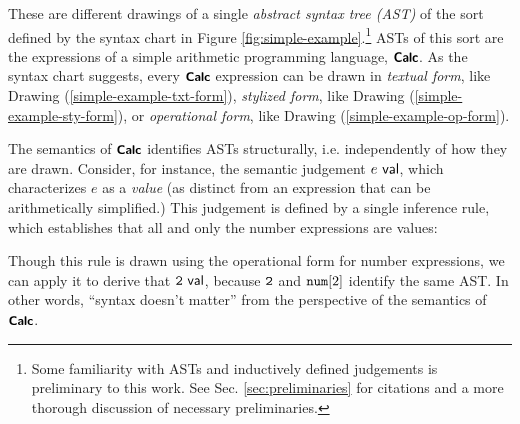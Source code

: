 \noindent
These are different drawings of a single \emph{abstract syntax tree (AST)} of the sort defined by the syntax chart in Figure \ref{fig:simple-example}.\footnote{Some familiarity with ASTs and inductively defined judgements is preliminary to this work. See Sec. \ref{sec:preliminaries} for citations and a more thorough discussion of necessary preliminaries.} ASTs of this sort are the expressions of a simple arithmetic programming language, $\simplelang$. 
As the syntax chart suggests, every $\simplelang$ expression can be drawn in \emph{textual form}, like Drawing (\ref{simple-example-txt-form}), \emph{stylized form}, like Drawing (\ref{simple-example-sty-form}), or \emph{operational form}, like Drawing (\ref{simple-example-op-form}).





 The semantics of $\simplelang$ identifies ASTs {structurally}, i.e. independently of how they are drawn. Consider, for instance, the semantic judgement $\isvalU{e}$, which characterizes $e$ as a \emph{value} (as distinct from an expression that can be arithmetically simplified.) This judgement is defined by a single inference rule, which establishes that all and only the number expressions are values:
\begin{mathpar}
\end{mathpar}
Though this rule is drawn using the operational form for number expressions, we can apply it to derive that $\isvalU{\numintro{2}}$, because $\numintro{2}$ and $\anumintro{2}$ identify the same AST. In other words, ``syntax doesn't matter'' from the perspective of the semantics of $\simplelang$.


